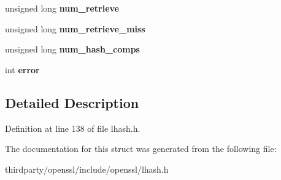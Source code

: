 \begin{DoxyCompactItemize}
$$unsigned long {\bfseries num\+\_\+retrieve}
\item 
\mbox{\label{structlhash__st_a387e6db76e41d95cdcdb97a518eda2a8}} 
unsigned long {\bfseries num\+\_\+retrieve\+\_\+miss}
\item 
\mbox{\label{structlhash__st_a9e918c731a184cab5fa9a7919b3633c4}} 
unsigned long {\bfseries num\+\_\+hash\+\_\+comps}
\item 
\mbox{\label{structlhash__st_aec4f09d46d46d5734bc1d66706533ed3}} 
int {\bfseries error}
\end{DoxyCompactItemize}


\subsection{Detailed Description}


Definition at line 138 of file lhash.\+h.



The documentation for this struct was generated from the following file\+:\begin{DoxyCompactItemize}
\item 
thirdparty/openssl/include/openssl/lhash.\+h\end{DoxyCompactItemize}
